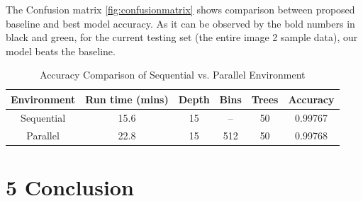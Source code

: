 \documentclass{neu_handout}
\begin{document}
The Confusion matrix \ref{fig:confusionmatrix} shows comparison between proposed baseline and best model accuracy. As it can be observed by the bold numbers in black and green, for the current testing set (the entire image 2 sample data), our model beats the baseline.

\begin{table}[h!]
\centering
 \begin{tabular}{||c c c c c c||} 
 \hline
Environment & Run time (mins) & Depth & Bins & Trees & Accuracy \\ [0.5ex] 
 \hline\hline
Sequential & 15.6  & 15  & -- & 50 & 0.99767 \\
Parallel & 22.8  & 15  & 512 & 50 & 0.99768 \\[1ex] 
 \hline
 \end{tabular}
 \caption{Accuracy Comparison of Sequential vs. Parallel Environment}
 \label{tab:accuracy-comparison}
\end{table}


\section*{5 Conclusion}


\newpage
\end{document}
